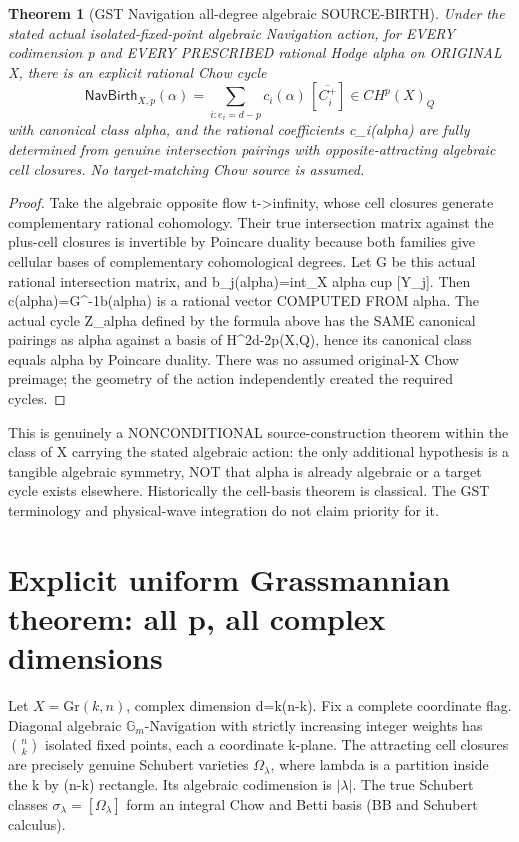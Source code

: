 \documentclass[11pt]{article}
\newtheorem{theorem}{Theorem}
\begin{document}
\begin{theorem}[GST Navigation all-degree algebraic SOURCE-BIRTH]
Under the stated actual isolated-fixed-point algebraic
Navigation action, for EVERY codimension p and EVERY
PRESCRIBED rational Hodge alpha on ORIGINAL X,
there is an explicit rational Chow cycle
\[
\boxed{
\mathsf{NavBirth}_{X,p}(\alpha)
=\sum_{i:e_i=d-p} c_i(\alpha)\,
 [\overline{C_i^+}]\in CH^p(X)_Q
}
\]
with canonical class alpha, and the rational
coefficients c_i(alpha) are fully determined
from genuine intersection pairings with
opposite-attracting algebraic cell closures.
No target-matching Chow source is assumed.
\end{theorem}
\begin{proof}
Take the algebraic opposite flow t->infinity,
whose cell closures generate complementary
rational cohomology. Their true intersection
matrix against the plus-cell closures is
invertible by Poincare duality because both
families give cellular bases of
complementary cohomological degrees.
Let G be this actual rational intersection
matrix, and b_j(alpha)=int_X alpha cup [Y_j].
Then c(alpha)=G^{-1}b(alpha) is a rational
vector COMPUTED FROM alpha.
The actual cycle Z_alpha defined by the
formula above has the SAME canonical
pairings as alpha against a basis of
H^{2d-2p}(X,Q), hence its canonical class
equals alpha by Poincare duality.
There was no assumed original-X Chow
preimage; the geometry of the action
independently created the required cycles.
\end{proof}

This is genuinely a NONCONDITIONAL source-construction
theorem within the class of X carrying the stated
algebraic action: the only additional hypothesis is
a tangible algebraic symmetry, NOT that alpha is
already algebraic or a target cycle exists elsewhere.
Historically the cell-basis theorem is classical.
The GST terminology and physical-wave integration
do not claim priority for it.

\section{Explicit uniform Grassmannian theorem: all p, all complex dimensions}
Let \(X=\mathrm{Gr}(k,n)\), complex dimension d=k(n-k).
Fix a complete coordinate flag. Diagonal algebraic
\(\mathbb G_m\)-Navigation with strictly increasing
integer weights has \({n\choose k}\) isolated fixed points,
each a coordinate k-plane. The attracting cell
closures are precisely genuine Schubert varieties
\(\Omega_\lambda\), where lambda is a partition inside
the k by (n-k) rectangle. Its algebraic codimension
is \(|\lambda|\). The true Schubert classes
\(\sigma_\lambda=[\Omega_\lambda]\) form an integral
Chow and Betti basis (BB and Schubert calculus).
\end{document}
